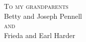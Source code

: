 \cleardoublepage
{}
{}
\vspace*{.1\textheight}
\begin{center}
\textsc{To my grandparents}\\
Betty and Joseph Pennell\\
\textsc{and}\\
Frieda and Earl Harder
\end{center}
